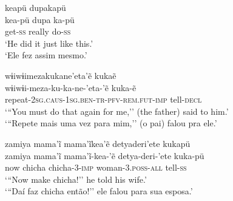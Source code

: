 \documentclass[output=paper,
modfonts,nonflat
]{langsci/langscibook}
\begin{document}

\ea   keapü dupakapü \\[.3em]
\gll 	kea-pü dupa ka-pü\\
get-\textsc{ss} really do-\textsc{ss}\\
\glt   `He did it just like this.' \\
`Ele fez assim mesmo.'\\
\z

\ea  wɨiwɨimezakukane'eta'ẽ kukaẽ \\[.3em]
\gll 	wɨiwɨi-meza-ku-ka-ne-'eta-'ẽ kuka-ẽ\\
repeat-\textsc{2sg.caus-1sg.ben-tr-pfv-rem.fut-imp} tell-\textsc{decl}\\
\glt    `{``}You must do that again for me,'' (the father) said to him.'\\
`{``}Repete mais uma vez para mim,'' (o pai) falou pra ele.'
\z

\ea   zamiya mama'ĩ mama'ĩkea'ẽ detyaderi'ete kukapü \\[.3em]
\gll  zamiya mama'ĩ mama'ĩ-kea-'ẽ detya-deri-'ete kuka-pü\\
now chicha chicha-\textsc{3-imp} woman-\textsc{3.poss-all} tell-\textsc{ss}\\
\glt    `{``}Now make chicha!'' he told his wife.'\\
 `{``}Daí faz chicha então!'' ele falou para sua esposa.'\\
\z
\end{document}
